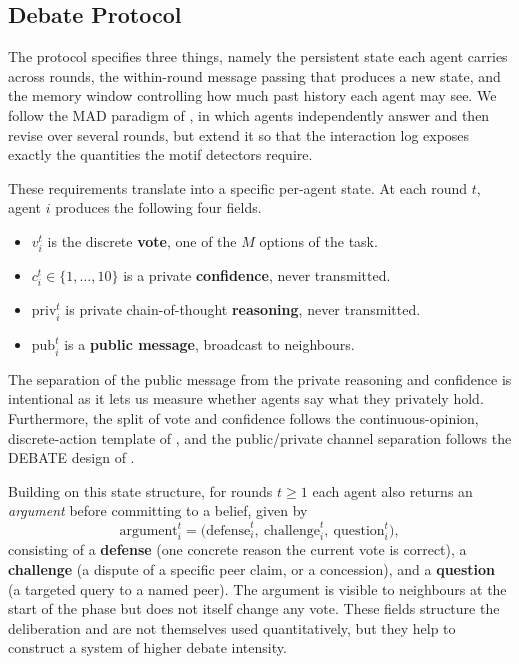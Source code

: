 \subsection{Debate Protocol}
\label{sec:setup:protocol}

The protocol specifies three things, namely the persistent state each agent carries
across rounds, the within-round message passing that produces a new state, and
the memory window controlling how much past history each agent may see. We follow
the \ac{MAD} paradigm of \citet{du2024improving}, in which agents
independently answer and then revise over several rounds, but extend it so
that the interaction log exposes exactly the quantities the motif detectors
require.

\label{sec:setup:protocol:state}%
These requirements translate into a specific per-agent state. At each round $t$, agent $i$ produces the following four fields.
\begin{itemize}
  \item $v_i^{t}$ is the discrete \textbf{vote}, one of the $M$ options of the task.
  \item $c_i^{t} \in \{1,\ldots,10\}$ is a private \textbf{confidence}, never transmitted.
  \item $\text{priv}_i^{t}$ is private chain-of-thought \textbf{reasoning}, never transmitted.
  \item $\text{pub}_i^{t}$ is a \textbf{public message}, broadcast to neighbours.
\end{itemize}
The separation of the public message from the private reasoning and confidence is
intentional as it lets us measure whether agents say what they privately hold. 
Furthermore, the split of vote and confidence follows the continuous-opinion,
discrete-action template of \citet{martins2008coda}, and the public/private
channel separation follows the DEBATE design of \citet{chuang2025debate}.

Building on this state structure, for rounds $t \geq 1$ each agent also returns an \emph{argument} before
committing to a belief, given by
\begin{equation}
  \text{argument}_i^{t} = \big(\text{defense}_i^{t},\ \text{challenge}_i^{t},\ \text{question}_i^{t}\big),
\end{equation}
consisting of a \textbf{defense} (one concrete reason the current vote is
correct), a \textbf{challenge} (a dispute of a specific peer claim, or a
concession), and a \textbf{question} (a targeted query to a named peer). The
argument is visible to neighbours at the start of the \updatephase{} phase but does not itself change
any vote. These fields structure the deliberation and are not themselves used
quantitatively, but they help to construct a system of higher debate intensity. 

